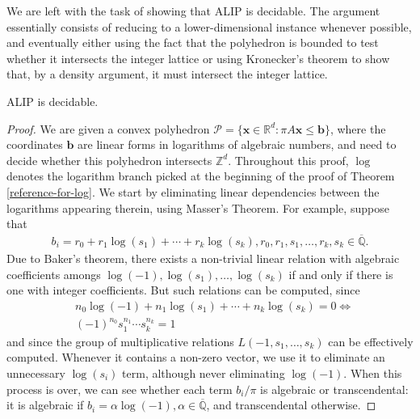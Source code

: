 We are left with the task of showing that ALIP is decidable. The argument essentially consists of reducing to a lower-dimensional instance whenever possible, and eventually either using the fact that the polyhedron is bounded to test whether it intersects the integer lattice or using Kronecker's theorem to show that, by a density argument, it must intersect the integer lattice.

\begin{theorem}
ALIP is decidable.
\end{theorem}

\begin{proof}
We are given a convex polyhedron $\mathcal{P}=\lbrace \boldsymbol{x} \in \mathbb{R}^{d} : \pi A \boldsymbol{x} \leq \boldsymbol{b} \rbrace$, where the coordinates $\boldsymbol{b}$ are linear forms in logarithms of algebraic numbers, and need to decide whether this polyhedron intersects $\mathbb{Z}^{d}$. Throughout this proof, $\log$ denotes the logarithm branch picked at the beginning of the proof of Theorem \ref{reference-for-log}. We start by eliminating linear dependencies between the logarithms appearing therein, using Masser's Theorem. For example, suppose that
\begin{align*}
b_{i} = r_{0} + r_{1} \log(s_{1}) + \cdots + r_{k} \log(s_{k}), r_{0}, r_{1}, s_{1}, \ldots, r_{k}, s_{k} \in \overline{\mathbb{Q}}.
\end{align*}
Due to Baker's theorem, there exists a non-trivial linear relation with algebraic coefficients amongs $\log(-1), \log(s_{1}), \ldots, \log(s_{k})$ if and only if there is one with integer coefficients. But such relations can be computed, since
\begin{align*}
&n_{0} \log(-1) + n_{1} \log(s_{1}) + \cdots + n_{k} \log(s_{k}) = 0 \Leftrightarrow \\
&(-1)^{n_{0}} s_{1}^{n_{1}} \cdots s_{k}^{n_{k}} = 1
\end{align*}
and since the group of multiplicative relations $L(-1, s_{1}, \ldots, s_{k})$ can be effectively computed. Whenever it contains a non-zero vector, we use it to eliminate an unnecessary $\log(s_{i})$ term, although never eliminating $\log(-1)$. When this process is over, we can see whether each term $b_{i}/\pi$ is algebraic or transcendental: it is algebraic if $b_{i} = \alpha \log(-1), \alpha \in \overline{\mathbb{Q}}$, and transcendental otherwise.


\end{proof}
